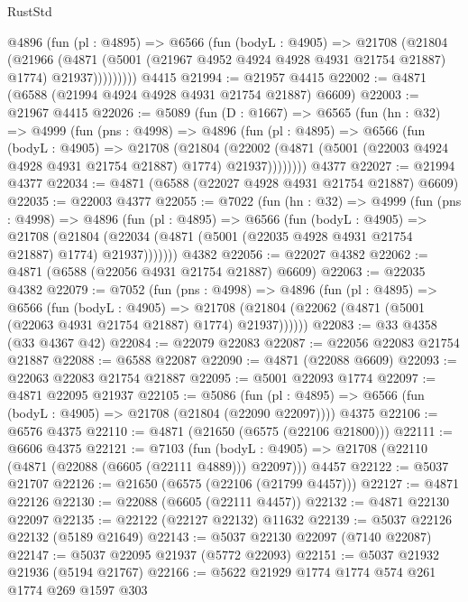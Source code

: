\begin{lexlean}{RustStd}
\begin{coremodule}
{\begin{coremodule}
{{{{{{{{{{{{{{{{{{{{{{{{{{{{{          @4896
            (fun (pl : @4895) =>
            @6566
              (fun (bodyL : @4905) =>
              @21708
                (@21804
                  (@21966
                    (@4871
                      (@5001 (@21967 @4952 @4924 @4928 @4931 @21754 @21887) @1774)
                      @21937)))))))))
    @4415
@21994 := @21957 @4415
@22002 := @4871 (@6588 (@21994 @4924 @4928 @4931 @21754 @21887) @6609)
@22003 := @21967 @4415
@22026 := @5089
    (fun (D : @1667) =>
    @6565
      (fun (hn : @32) =>
      @4999
        (fun (pns : @4998) =>
        @4896
          (fun (pl : @4895) =>
          @6566
            (fun (bodyL : @4905) =>
            @21708
              (@21804
                (@22002 (@4871 (@5001 (@22003 @4924 @4928 @4931 @21754 @21887) @1774) @21937))))))))
    @4377
@22027 := @21994 @4377
@22034 := @4871 (@6588 (@22027 @4928 @4931 @21754 @21887) @6609)
@22035 := @22003 @4377
@22055 := @7022
    (fun (hn : @32) =>
    @4999
      (fun (pns : @4998) =>
      @4896
        (fun (pl : @4895) =>
        @6566
          (fun (bodyL : @4905) =>
          @21708
            (@21804 (@22034 (@4871 (@5001 (@22035 @4928 @4931 @21754 @21887) @1774) @21937)))))))
    @4382
@22056 := @22027 @4382
@22062 := @4871 (@6588 (@22056 @4931 @21754 @21887) @6609)
@22063 := @22035 @4382
@22079 := @7052
    (fun (pns : @4998) =>
    @4896
      (fun (pl : @4895) =>
      @6566
        (fun (bodyL : @4905) =>
        @21708 (@21804 (@22062 (@4871 (@5001 (@22063 @4931 @21754 @21887) @1774) @21937))))))
@22083 := @33 @4358 (@33 @4367 @42)
@22084 := @22079 @22083
@22087 := @22056 @22083 @21754 @21887
@22088 := @6588 @22087
@22090 := @4871 (@22088 @6609)
@22093 := @22063 @22083 @21754 @21887
@22095 := @5001 @22093 @1774
@22097 := @4871 @22095 @21937
@22105 := @5086
    (fun (pl : @4895) => @6566 (fun (bodyL : @4905) => @21708 (@21804 (@22090 @22097))))
    @4375
@22106 := @6576 @4375
@22110 := @4871 (@21650 (@6575 (@22106 @21800)))
@22111 := @6606 @4375
@22121 := @7103
    (fun (bodyL : @4905) => @21708 (@22110 (@4871 (@22088 (@6605 (@22111 @4889))) @22097)))
    @4457
@22122 := @5037 @21707
@22126 := @21650 (@6575 (@22106 (@21799 @4457)))
@22127 := @4871 @22126
@22130 := @22088 (@6605 (@22111 @4457))
@22132 := @4871 @22130 @22097
@22135 := @22122 (@22127 @22132) @11632
@22139 := @5037 @22126 @22132 (@5189 @21649)
@22143 := @5037 @22130 @22097 (@7140 @22087)
@22147 := @5037 @22095 @21937 (@5772 @22093)
@22151 := @5037 @21932 @21936 (@5194 @21767)
@22166 := @5622
    @21929
    @1774
    @1774
    @574
    @261
    @1774
    @269
    @1597
    @303
}}}}}}}}}}}}}}}}}}}}}}}}}}}}}
\end{coremodule}}
\end{coremodule}
\end{lexlean}
